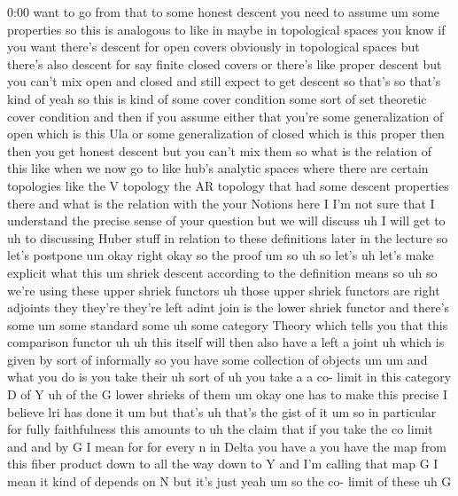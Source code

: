 \begin{unfinished}{0:00}
want  to  go  from  that  to  some  honest
descent  you  need  to  assume  um  some
properties  so  this  is  analogous  to  like
in  maybe  in  topological  spaces  you  know
if  you  want  there's  descent  for  open
covers  obviously  in  topological  spaces
but  there's  also  descent  for  say  finite
closed  covers  or  there's  like  proper
descent  but  you  can't  mix  open  and
closed  and  still  expect  to  get  descent
so  that's  so  that's  kind  of  yeah  so  this
is  kind  of  some  cover  condition  some
sort  of  set  theoretic  cover  condition
and  then  if  you  assume  either  that
you're  some  generalization  of  open  which
is  this  Ula  or  some  generalization  of
closed  which  is  this  proper  then  then
you  get  honest  descent  but  you  can't  mix
them  so  what  is  the  relation  of  this
like  when  we  now  go
to  like  hub's  analytic  spaces  where
there  are  certain  topologies  like  the  V
topology  the  AR
topology  that  had  some  descent
properties  there  and  what  is  the
relation  with  the  your  Notions  here  I
I'm  not  sure  that  I  understand  the
precise  sense  of  your  question  but  we
will  discuss  uh  I  will  get  to
uh  to  discussing  Huber  stuff  in  relation
to  these  definitions  later  in  the
lecture  so  let's
postpone
um  okay  right  okay
so  the
proof
um  so  uh  so  let's  uh  let's  make  explicit
what  this  um  shriek  descent  according  to
the  definition  means
so  uh  so  we're  using  these  upper  shriek
functors  uh  those  upper  shriek  functors
are  right  adjoints  they  they're  they're
left  adint  join  is  the  lower  shriek
functor  and  there's  some
um  some  standard
some  uh  some  category  Theory  which  tells
you  that  this  comparison  functor
uh  uh  this  itself  will  then  also  have  a
left  a
joint  uh  which  is  given  by  sort  of
informally  so  you  have  some  collection
of
objects
um
um  and  what  you  do  is  you  take  their  uh
sort
of
uh  you  take  a  a  co-  limit  in  this
category  D  of
Y  uh  of  the  G  lower  shrieks  of
them  um  okay  one  has  to  make  this
precise  I  believe  lri  has  done  it  um  but
that's
uh  that's  the  gist  of  it  um  so  in
particular  for  fully
faithfulness  this  amounts  to  uh  the
claim  that  if  you  take  the  co  limit  and
and  by  G  I  mean  for  for  every  n  in  Delta
you  have  a  you  have  the  map  from  this
fiber  product  down  to  all  the  way  down
to  Y  and  I'm  calling  that  map  G  I  mean
it  kind  of  depends  on  N  but  it's  just
yeah  um  so  the  co-  limit  of  these  uh  G

\end{unfinished}
